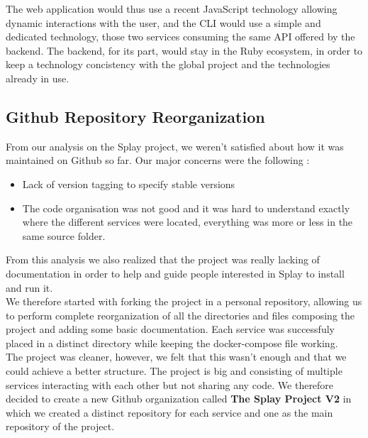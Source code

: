 \documentclass{eplmastersthesis}
\begin{document}
        The web application would thus use a recent JavaScript technology
        allowing dynamic interactions with the user, and the CLI would use
        a simple and dedicated technology, those two services consuming the
        same API offered by the backend. The backend, for its part, would
        stay in the Ruby ecosystem, in order to keep a technology concistency
        with the global project and the technologies already in use.

      \subsection{Github Repository Reorganization}

        From our analysis on the Splay project, we weren't satisfied about how
        it was maintained on Github so far. Our major concerns were the
        following :

        \begin{itemize}
          \item Lack of version tagging to specify stable versions
          \item The code organisation was not good and it was hard to
          understand exactly where the different services were located,
          everything was more or less in the same source folder.
        \end{itemize}

        From this analysis we also realized that the project was really
        lacking of documentation in order to help and guide people interested
        in Splay to install and run it.\\

        We therefore started with forking the project in a personal repository,
        allowing us to perform complete reorganization of all the directories
        and files composing the project and adding some basic documentation.
        Each service was successfuly placed in a distinct directory while
        keeping the docker-compose file working.\\
        The project was cleaner, however, we felt that this wasn't enough
        and that we could achieve a better structure. The project is big and
        consisting of multiple services interacting with each other but
        not sharing any code. We therefore decided to create a new Github
        organization called \textbf{The Splay Project V2} in which we created
        a distinct repository for each service and one as the main repository
        of the project.\\
\end{document}
